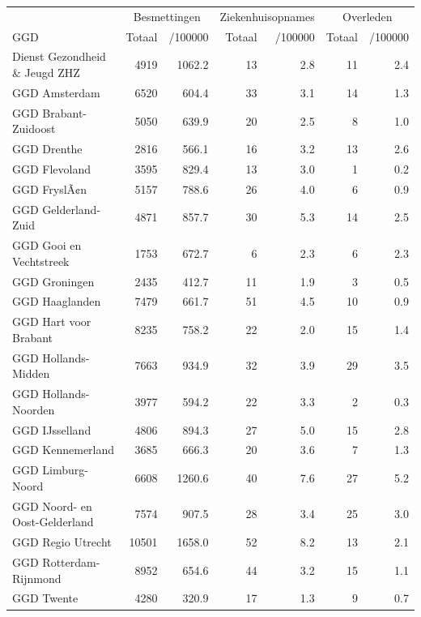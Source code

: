 \documentclass[
  english,
  man,floatsintext]{apa6}
\begin{document}
\begin{table}
\centering\begingroup\fontsize{10}{12}\selectfont

\begin{threeparttable}
\begin{tabular}{lrrrrrr}
\toprule
\multicolumn{1}{c}{ } & \multicolumn{2}{c}{Besmettingen} & \multicolumn{2}{c}{Ziekenhuisopnames} & \multicolumn{2}{c}{Overleden} \\
\cmidrule(l{3pt}r{3pt}){2-3} \cmidrule(l{3pt}r{3pt}){4-5} \cmidrule(l{3pt}r{3pt}){6-7}
GGD & Totaal & /100000 & Totaal & /100000 & Totaal & /100000\\
\midrule
Dienst Gezondheid \& Jeugd ZHZ & 4919 & 1062.2 & 13 & 2.8 & 11 & 2.4\\
GGD Amsterdam & 6520 & 604.4 & 33 & 3.1 & 14 & 1.3\\
GGD Brabant-Zuidoost & 5050 & 639.9 & 20 & 2.5 & 8 & 1.0\\
GGD Drenthe & 2816 & 566.1 & 16 & 3.2 & 13 & 2.6\\
GGD Flevoland & 3595 & 829.4 & 13 & 3.0 & 1 & 0.2\\
GGD FryslÃ¢n & 5157 & 788.6 & 26 & 4.0 & 6 & 0.9\\
GGD Gelderland-Zuid & 4871 & 857.7 & 30 & 5.3 & 14 & 2.5\\
GGD Gooi en Vechtstreek & 1753 & 672.7 & 6 & 2.3 & 6 & 2.3\\
GGD Groningen & 2435 & 412.7 & 11 & 1.9 & 3 & 0.5\\
GGD Haaglanden & 7479 & 661.7 & 51 & 4.5 & 10 & 0.9\\
GGD Hart voor Brabant & 8235 & 758.2 & 22 & 2.0 & 15 & 1.4\\
GGD Hollands-Midden & 7663 & 934.9 & 32 & 3.9 & 29 & 3.5\\
GGD Hollands-Noorden & 3977 & 594.2 & 22 & 3.3 & 2 & 0.3\\
GGD IJsselland & 4806 & 894.3 & 27 & 5.0 & 15 & 2.8\\
GGD Kennemerland & 3685 & 666.3 & 20 & 3.6 & 7 & 1.3\\
GGD Limburg-Noord & 6608 & 1260.6 & 40 & 7.6 & 27 & 5.2\\
GGD Noord- en Oost-Gelderland & 7574 & 907.5 & 28 & 3.4 & 25 & 3.0\\
GGD Regio Utrecht & 10501 & 1658.0 & 52 & 8.2 & 13 & 2.1\\
GGD Rotterdam-Rijnmond & 8952 & 654.6 & 44 & 3.2 & 15 & 1.1\\
GGD Twente & 4280 & 320.9 & 17 & 1.3 & 9 & 0.7\\

\end{tabular}
\end{threeparttable}
\end{table}
\end{document}
